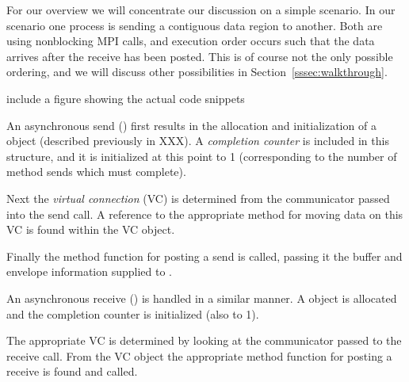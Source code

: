 For our overview we will concentrate our discussion on a simple scenario.  In
our scenario one process is sending a contiguous data region to another.  Both
are using nonblocking MPI calls, and execution order occurs such that the data
arrives after the receive has been posted.  This is of course not the only
possible ordering, and we will discuss other possibilities in
Section~\ref{sssec:walkthrough}.

\begin{cmt}
  include a figure showing the actual code snippets
\end{cmt}


An asynchronous send () first results in the allocation and
initialization of a  object (described previously in XXX).
A \emph{completion counter} is included in this structure, and it is
initialized at this point to 1 (corresponding to the number of method sends
which must complete).

Next the \emph{virtual connection} (VC) is determined from the communicator
passed into the send call.  A reference to the appropriate method for moving
data on this VC is found within the VC object.

Finally the method function for posting a send is called, passing it the buffer
and envelope information supplied to . 



An asynchronous receive () is handled in a similar manner.
A  object is allocated and the completion counter is
initialized (also to 1).

The appropriate VC is determined by looking at the communicator passed to the
receive call.  From the VC object the appropriate method function for posting a
receive is found and called.
 
% 


